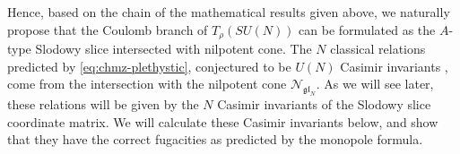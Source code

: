\documentclass[12pt,a4paper]{article}
\begin{document}
\medskip

Hence, based on the chain of the mathematical results given above, we naturally propose that the Coulomb branch of $T_\rho(SU(N))$ can be formulated as the $A$-type Slodowy slice intersected with nilpotent cone.
The $N$ classical relations predicted by \eqref{eq:chmz-plethystic}, conjectured to be $U(N)$ Casimir invariants \cite{CremonesiEtAl2014}, come from the intersection with the nilpotent cone $\mathcal{N}_{\mathfrak{gl}_N}$.
As we will see later, these relations will be given by the $N$ Casimir invariants of the Slodowy slice coordinate matrix. 
We will calculate these Casimir invariants below, and show that they have the correct fugacities as predicted by the monopole formula.
\end{document}
